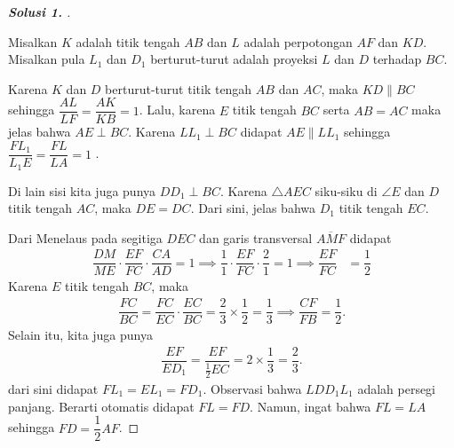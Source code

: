 \documentclass[letterpaper, 13pt]{scrartcl}
\begin{document}
\begin{proof}[\textbf{Solusi 1. }]
\begin{center}
\end{center}

    Misalkan $K$ adalah titik tengah $AB$ dan $L$ adalah perpotongan $AF$ dan $KD$. Misalkan pula $L_1$ dan $D_1$ berturut-turut adalah proyeksi $L$ dan $D$ terhadap $BC$.

    Karena $K$ dan $D$ berturut-turut titik tengah $AB$ dan $AC$, maka $KD \parallel BC$ sehingga $\dfrac{AL}{LF} = \dfrac{AK}{KB} = 1$. Lalu, karena $E$ titik tengah $BC$ serta $AB=AC$ maka jelas bahwa $AE \perp BC$. Karena $LL_1 \perp BC$ didapat $AE \parallel LL_1$ sehingga $\dfrac{FL_1}{L_1E} = \dfrac{FL}{LA} = 1$ .

    Di lain sisi kita juga punya $DD_1 \perp BC$. Karena $\triangle AEC$ siku-siku di $\angle E$ dan $D$ titik tengah $AC$, maka $DE=DC$. Dari sini, jelas bahwa $D_1$ titik tengah $EC$.

    Dari Menelaus pada segitiga $DEC$ dan garis transversal $\overline{AMF}$ didapat
    \begin{align*}
        \dfrac{DM}{ME}\cdot \dfrac{EF}{FC} \cdot \dfrac{CA}{AD} = 1 \implies
        \dfrac{1}{1}\cdot \dfrac{EF}{FC} \cdot \dfrac{2}{1} = 1 \implies
        \dfrac{EF}{FC} &= \dfrac{1}{2}
    \end{align*}
    Karena $E$ titik tengah $BC$, maka 
    \begin{align*}
        \dfrac{FC}{BC} = \dfrac{FC}{EC} \cdot \dfrac{EC}{BC} = \dfrac{2}{3} \times \dfrac{1}{2} = \dfrac{1}{3} \implies \dfrac{CF}{FB} = \dfrac{1}{2}.
    \end{align*}
    Selain itu, kita juga punya
    \begin{align*}
        \dfrac{EF}{ED_1} = \dfrac{EF}{\frac{1}{2}EC} = 2 \times \dfrac{1}{3} = \dfrac{2}{3}.
    \end{align*}
    dari sini didapat $FL_1 = EL_1 = FD_1$. Observasi bahwa $LDD_1L_1$ adalah persegi panjang. Berarti otomatis didapat $FL = FD$. Namun, ingat bahwa $FL = LA$ sehingga $FD = \dfrac{1}{2}AF$.


\end{proof}
\end{document}
